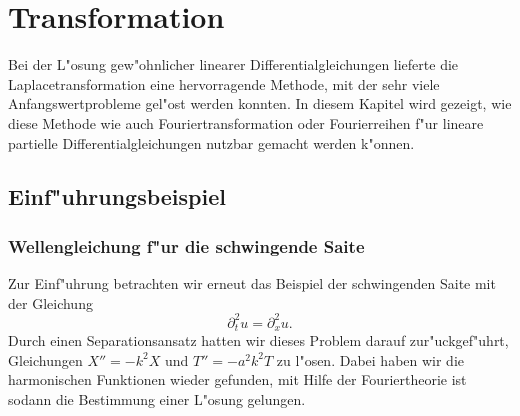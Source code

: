 %
%
%
\chapter{Transformation}
Bei der L"osung gew"ohnlicher linearer Differentialgleichungen lieferte die
Laplacetransformation eine hervorragende Methode, mit der sehr
viele Anfangswertprobleme gel"ost werden konnten.
In diesem Kapitel wird gezeigt, wie diese Methode wie auch
Fouriertransformation oder Fourierreihen 
f"ur lineare partielle Differentialgleichungen nutzbar gemacht
werden k"onnen.

\section{Einf"uhrungsbeispiel}
\subsection{Wellengleichung f"ur die schwingende Saite}
Zur Einf"uhrung betrachten wir erneut das Beispiel der
schwingenden Saite mit der Gleichung
\[
\partial_t^2u=\partial_x^2u.
\]
Durch einen Separationsansatz hatten wir dieses Problem
darauf zur"uckgef"uhrt, Gleichungen $X''=-k^2X$ und $T''=-a^2k^2T$
zu l"osen.
Dabei haben wir die harmonischen Funktionen wieder gefunden,
mit Hilfe der Fouriertheorie ist sodann die Bestimmung einer L"osung
gelungen.

